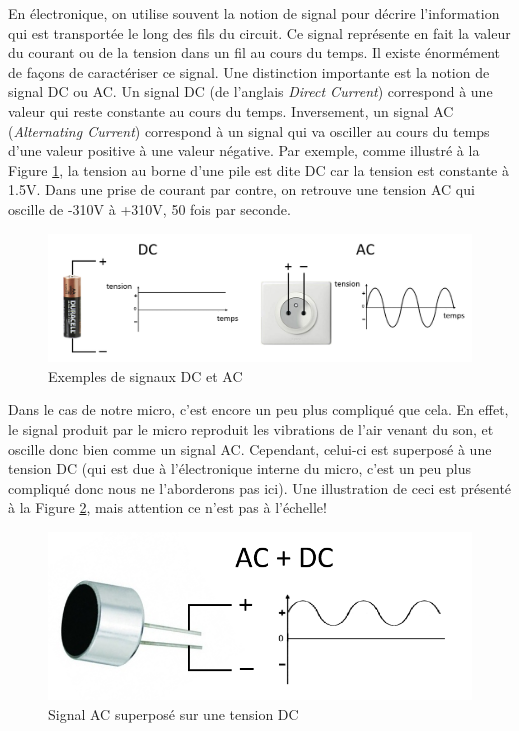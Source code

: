 
En électronique, on utilise souvent la notion de signal pour décrire l'information qui est transportée le long des fils du circuit. Ce signal représente en fait la valeur du courant ou de la tension dans un fil au cours du temps. Il existe énormément de façons de caractériser ce signal. Une distinction importante est la notion de signal DC ou AC. Un signal DC (de l'anglais \textit{Direct Current}) correspond à une valeur qui reste constante au cours du temps. Inversement, un signal AC (\textit{Alternating Current}) correspond à un signal qui va osciller au cours du temps d'une valeur positive à une valeur négative. Par exemple, comme illustré à la Figure \ref{fig:ACDC}, la tension au borne d'une pile est dite DC car la tension est constante à 1.5V. Dans une prise de courant par contre, on retrouve une tension AC qui oscille de -310V à +310V, 50 fois par seconde.\\

\begin{figure}[!ht]
	\centering
	\includegraphics[width=\textwidth]{figures/AC-DC.PNG}
	\caption{Exemples de signaux DC et AC}
	\label{fig:ACDC}
\end{figure}

Dans le cas de notre micro, c'est encore un peu plus compliqué que cela. En effet, le signal produit par le micro reproduit les vibrations de l'air venant du son, et oscille donc bien comme un signal AC. Cependant, celui-ci est superposé à une tension DC (qui est due à l'électronique interne du micro, c'est un peu plus compliqué donc nous ne l'aborderons pas ici). Une illustration de ceci est présenté à la Figure \ref{fig:ACplusDC}, mais attention ce n'est pas à l'échelle!

\begin{figure}[!ht]
	\centering
	\includegraphics[width=.5\textwidth]{figures/microSignal.PNG}
	\caption{Signal AC superposé sur une tension DC}
	\label{fig:ACplusDC}
\end{figure}